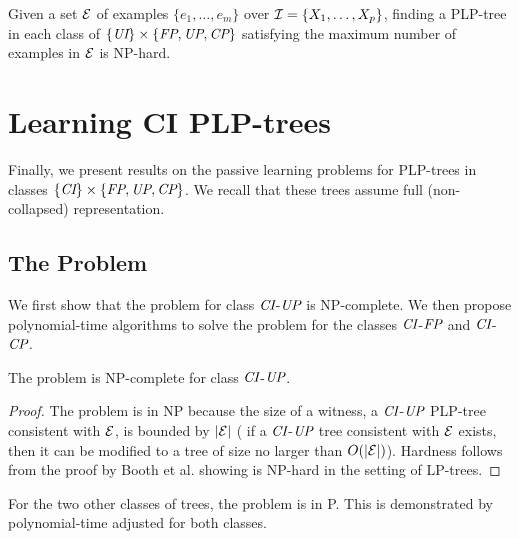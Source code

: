 \begin{cor}
\label{cor:UIFP_least}
Given a set $\mathcal{E}$ of examples $\{e_1,\ldots,e_m\}$ over 
$\mathcal{I}=\{X_1,\ldots,X_p\}$, finding a PLP-tree in each class of $\{\textit{UI}\} \times \{\textit{FP},\textit{UP},\textit{CP}\}$ 
satisfying the maximum number of examples in $\mathcal{E}$ is NP-hard.
\end{cor}

\section{Learning CI PLP-trees}
Finally, we present results on the passive learning problems for 
PLP-trees in classes $\{\textit{CI}\} \times \{\textit{FP},\textit{UP},\textit{CP}\}$. We recall that these
trees assume full (non-collapsed) representation.


\vspace{-0.1cm}
\subsection{The  Problem}

\vspace{-0.1cm}
We first show that the  problem for class $\textit{CI}$-$\textit{UP}$ is 
NP-complete. We then propose polynomial-time algorithms to solve the 
 problem
for the classes $\textit{CI}$-$\textit{FP}$ and $\textit{CI}$-$\textit{CP}$.

\begin{thm}
\label{thm:passlearn_CIUP}
	The  problem is NP-complete for class $\textit{CI}$-$\textit{UP}$.
\end{thm}
\begin{proof}
The problem is in NP because the size of a witness, 
a $\textit{CI}$-$\textit{UP}$ PLP-tree consistent with $\mathcal{E}$, is bounded by $|\mathcal{E}|$ (
if a $\textit{CI}$-$\textit{UP}$ tree consistent with $\mathcal{E}$ exists, then it can
be modified to a tree of size no larger than $O(|\mathcal{E}|)$).
	Hardness follows from the proof by Booth et al.  showing 
	 is NP-hard in the setting of LP-trees.
\end{proof}

For the two other classes of trees, the problem is in P. This is demonstrated 
by polynomial-time  adjusted for both classes.

